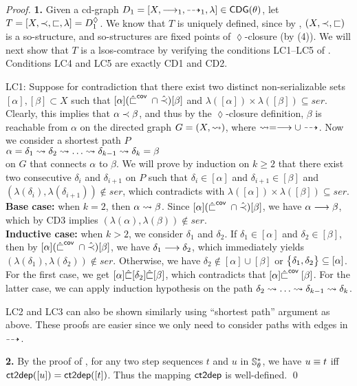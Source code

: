 \documentclass{llncs}
\begin{document}
\begin{proof} \textbf{1. } Given a cd-graph $D_1= \left[ X,\longrightarrow_1,\dashrightarrow_1,\lambda \right]\in \mathsf{CDG}(\theta)$, let $T= \left[ X,\prec,\sqsubset,\lambda \right] = D_1^{\lozenge}$. We know that $T$ is uniquely defined, since by , $(X,\prec,\sqsubset)$ is a so-structure, and so-structures are fixed points of $\lozenge$-closure (by  (4)). We will next show that $T$ is a lsos-comtrace by verifying the conditions \textsf{LC1}--\textsf{LC5} of . Conditions \textsf{LC4} and \textsf{LC5} are exactly \textsf{CD1} and \textsf{CD2}.

\textsf{LC1}: Suppose for contradiction that there exist two distinct non-serializable sets $[\alpha],[\beta]\subset X$ such that $[\alpha]({\hat{\sqsubset}}^{\mathsf{cov}\;}\cap \hat{\prec})[\beta]$ and $\lambda([\alpha])\times \lambda([\beta]) \subseteq ser$. Clearly, this implies that $\alpha \prec \beta$, and thus by the $\lozenge$-closure definition, $\beta$ is reachable from $\alpha$ on the directed graph $G=(X,\rightsquigarrow)$, where $\rightsquigarrow = \longrightarrow\cup \dashrightarrow$. Now we consider a shortest path $P$\smallskip\\
\mbox{\hspace{3.3cm}}$\alpha = \delta_1 \rightsquigarrow\delta_2 \rightsquigarrow\ldots\rightsquigarrow \delta_{k-1}\rightsquigarrow \delta_k = \beta$ \smallskip\\
on $G$ that connects $\alpha$ to $\beta$. We will prove by induction on $k\ge 2$ that there exist two consecutive $\delta_i$ and $\delta_{i+1}$ on $P$ such that $\delta_i\in [\alpha]$ and $\delta_{i+1}\in [\beta]$ and $(\lambda(\delta_{i}),\lambda(\delta_{i+1}))\not \in ser$, which contradicts with  $\lambda([\alpha])\times \lambda([\beta]) \subseteq ser$. \\
\textbf{Base case:} when $k=2$, then $\alpha \rightsquigarrow \beta$. Since $[\alpha]({\hat{\sqsubset}}^{\mathsf{cov}\;}\cap \hat{\prec})[\beta]$, we have $\alpha \longrightarrow \beta$, which by \textsf{CD3} implies $(\lambda(\alpha),\lambda(\beta))\not \in ser$.\\ \textbf{Inductive case:} when $k>2$, we consider  $\delta_1$ and  $\delta_2$. If $\delta_1\in [\alpha]$ and $\delta_2\in [\beta]$, then by $[\alpha]({\hat{\sqsubset}}^{\mathsf{cov}\;}\cap \hat{\prec})[\beta]$,  we have $\delta_1 \longrightarrow \delta_2$, which immediately yields $(\lambda(\delta_{1}),\lambda(\delta_{2}))\not \in ser$. Otherwise, we have $\delta_2\not\in [\alpha]\cup [\beta]$ or $\bigl\{\delta_1,\delta_2\bigr\}\subseteq [\alpha]$. For the first case, we get $[\alpha]\hat{\sqsubset}[\delta_2]\hat{\sqsubset}[\beta]$, which contradicts that $[\alpha]{\hat{\sqsubset}}^{\mathsf{cov}\;}[\beta]$. For the latter case, we can apply induction hypothesis on the path $\delta_2 \rightsquigarrow\ldots\rightsquigarrow \delta_{k-1}\rightsquigarrow \delta_k$.

\textsf{LC2} and \textsf{LC3} can also be shown similarly using ``shortest path'' argument as above. These proofs are easier since we only need to consider paths with edges in $\dashrightarrow$. 
 
\textbf{2. } By the proof of \cite[Lemma 4.7]{JK95}, for any two step sequences $t$ and $u$ in $\mathbb{S}_\theta^*$, we have $u \equiv t$ iff $\mathsf{ct2dep}([u]) = \mathsf{ct2dep}([t])$. Thus the mapping $\mathsf{ct2dep}$ is well-defined. \qed
\end{proof}
\end{document}
